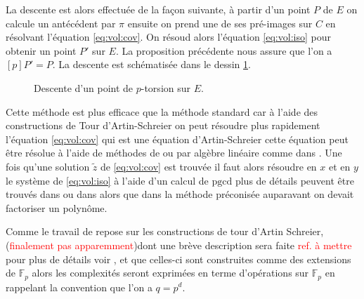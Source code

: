 \documentclass[10pt,a4paper]{book}
\theoremstyle{plain}
\theoremstyle{definition}
\theoremstyle{definition}
\theoremstyle{definition}
\theoremstyle{definition}
\theoremstyle{remark}
\theoremstyle{remark}
\begin{document}
La descente est alors effectuée de la façon suivante, à partir d'un point $P$ de $E$ on calcule un antécédent par $\pi$ ensuite on prend une de ses pré-images sur $C$ en résolvant l'équation \eqref{eq:vol:cov}. On résoud alors l'équation \eqref{eq:vol:iso} pour obtenir un point $P'$ sur $E$. La proposition précédente nous assure que l'on a $[p]P'=P$. La descente est schématisée dans le dessin \ref{fig:dra:des}.

\begin{figure}
\begin{center}
\label{fig:dra:des}
\caption{Descente d'un point de $p$-torsion sur $E$.}
\end{center}
\end{figure}

Cette méthode est plus efficace que la méthode standard car à l'aide des constructions de Tour d'Artin-Schreier on peut résoudre plus rapidement l'équation \eqref{eq:vol:cov} qui est une équation d'Artin-Schreier cette équation peut être résolue à l'aide de méthodes de \cite[§6.1]{DeFeo-Shost'12} ou par algèbre linéaire comme dans \cite{Couveignes96}. Une fois qu'une solution $\tilde{z}$ de \eqref{eq:vol:cov} est trouvée il faut alors résoudre en $x$ et en $y$ le système de \eqref{eq:vol:iso} à l'aide d'un calcul de $\mathrm{pgcd}$ plus de détails peuvent être trouvés dans \cite[§6.2]{Ler97a} ou dans \cite[§7]{DeFeo11} alors que dans la méthode préconisée auparavant on devait factoriser un polynôme.

Comme le travail de \cite{DeFeo11} repose sur les constructions de tour d'Artin Schreier, (\textcolor{red}{finalement pas apparemment})dont une brève description sera faite \textcolor{red}{ref. à mettre} pour plus de détails voir \cite{DeFeo-Shost'12}, et que celles-ci sont construites comme des extensions de $\mathbb{F}_p$ alors les complexités seront exprimées en terme d'opérations sur $\mathbb{F}_p$ en rappelant la convention que l'on a $q=p^d$.
\end{document}
